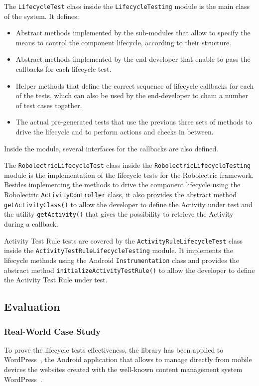 \documentclass[11pt,a4paper,notitlepage]{article}
\begin{document}
The \texttt{LifecycleTest} class inside the \texttt{LifecycleTesting} module is the main class of the system. It defines:
\begin{itemize}
	\item Abstract methods implemented by the sub-modules that allow to specify the means to control the component lifecycle, according to their structure.
	\item Abstract methods implemented by the end-developer that enable to pass the callbacks for each lifecycle test.
	\item Helper methods that define the correct sequence of lifecycle callbacks for each of the tests, which can also be used by the end-developer to chain a number of test cases together.
	\item The actual pre-generated tests that use the previous three sets of methods to drive the lifecycle and to perform actions and checks in between.
\end{itemize}
Inside the module, several interfaces for the callbacks are also defined. 

The \texttt{RobolectricLifecycleTest} class inside the  \texttt{RobolectricLifecycleTesting} module is the implementation of the lifecycle tests for the Robolectric framework. Besides implementing the methods to drive the component lifecycle using the Robolectric \texttt{ActivityController} class, it also provides the abstract method \texttt{getActivityClass()} to allow the developer to define the Activity under test and the utility \texttt{getActivity()} that gives the possibility to retrieve the Activity during a callback.

Activity Test Rule tests are covered by the \texttt{ActivityRuleLifecycleTest} class inside the \texttt{ActivityTestRuleLifecycleTesting} module. It implements the lifecycle methods using the Android \texttt{Instrumentation} class and provides the abstract method \texttt{initializeActivityTestRule()} to allow the developer to define the Activity Test Rule under test.

\subsection{Evaluation}

\subsubsection{Real-World Case Study}
To prove the lifecycle tests effectiveness, the library has been applied to WordPress~\cite{WordPressApp}, the Android application that allows to manage directly from mobile devices the websites created with the well-known content management system WordPress~\cite{WordPressCMS}.
\end{document}
